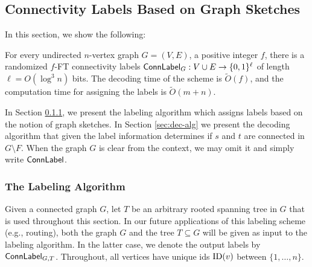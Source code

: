 \subsection{Connectivity Labels Based on Graph Sketches}\label{sec:ftconn-sketch}
In this section, we show the following:
\begin{theorem}
For every undirected $n$-vertex graph $G=(V,E)$, a positive integer $f$, there is a randomized $f$-FT connectivity labels $\mathsf{ConnLabel}_{G}: V \cup E \to \{0,1\}^{\ell}$ of length $\ell=O(\log^3 n)$ bits. The decoding time of the scheme is $\widetilde{O}(f)$, and the computation time for assigning the labels is $\widetilde{O}(m+n)$.
\end{theorem}
In Section \ref{sec:label-alg}, we present the labeling algorithm which assigns labels based on the notion of graph sketches. In Section \ref{sec:dec-alg} we present the decoding algorithm that given the label information determines if $s$ and $t$ are connected in $G \setminus F$. When the graph $G$ is clear from the context, we may omit it and simply write $\mathsf{ConnLabel}$. 



\subsubsection{The Labeling Algorithm}\label{sec:label-alg}
Given a connected graph $G$, let $T$ be an arbitrary rooted spanning tree in $G$ that is used throughout this section. In our future applications of this labeling scheme (e.g., routing), both the graph $G$ and the tree $T \subseteq G$ will be given as input to the labeling algorithm. In the latter case, we denote the output labels by $\mathsf{ConnLabel}_{G,T}$. Throughout, all vertices have unique ids $\operatorname{ID}(v)$ between $\{1,\ldots,n \}$.  

